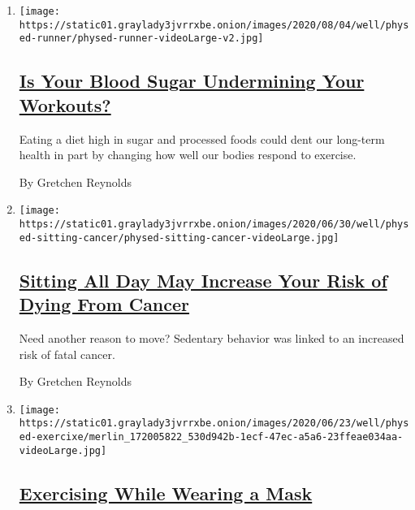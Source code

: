 \begin{enumerate}
\def\labelenumi{\arabic{enumi}.}
\item
  \texttt{[image: https://static01.graylady3jvrrxbe.onion/images/2020/08/04/well/physed-runner/physed-runner-videoLarge-v2.jpg]}

  \hypertarget{is-your-blood-sugar-undermining-your-workouts}{%
  \subsection{\texorpdfstring{\href{/2020/07/29/well/move/blood-sugar-diet-foods-workouts-exercise-muscles.html}{Is
  Your Blood Sugar Undermining Your
  Workouts?}}{Is Your Blood Sugar Undermining Your Workouts?}}\label{is-your-blood-sugar-undermining-your-workouts}}

  Eating a diet high in sugar and processed foods could dent our
  long-term health in part by changing how well our bodies respond to
  exercise.

  By Gretchen Reynolds
\item
  \texttt{[image: https://static01.graylady3jvrrxbe.onion/images/2020/06/30/well/physed-sitting-cancer/physed-sitting-cancer-videoLarge.jpg]}

  \hypertarget{sitting-all-day-may-increase-your-risk-of-dying-from-cancer}{%
  \subsection{\texorpdfstring{\href{/2020/06/24/well/move/sitting-sedentary-exercise-cancer-risk.html}{Sitting
  All Day May Increase Your Risk of Dying From
  Cancer}}{Sitting All Day May Increase Your Risk of Dying From Cancer}}\label{sitting-all-day-may-increase-your-risk-of-dying-from-cancer}}

  Need another reason to move? Sedentary behavior was linked to an
  increased risk of fatal cancer.

  By Gretchen Reynolds
\item
  \texttt{[image: https://static01.graylady3jvrrxbe.onion/images/2020/06/23/well/physed-exercixe/merlin\_172005822\_530d942b-1ecf-47ec-a5a6-23ffeae034aa-videoLarge.jpg]}

  \hypertarget{exercising-while-wearing-a-mask}{%
  \subsection{\texorpdfstring{\href{/2020/06/17/well/move/exercising-while-wearing-a-mask.html}{Exercising
  While Wearing a
  Mask}}{Exercising While Wearing a Mask}}\label{exercising-while-wearing-a-mask}}


\end{enumerate}
